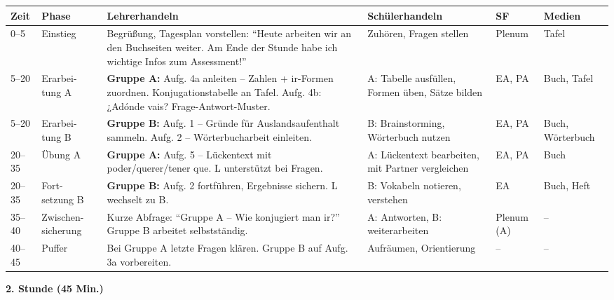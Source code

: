 \documentclass[11pt,a4paper]{article}
\begin{document}
\begin{longtable}{|p{0.8cm}|p{1.5cm}|p{4.5cm}|p{3cm}|p{1.3cm}|p{1.8cm}|}
\hline
\textbf{Zeit} & \textbf{Phase} & \textbf{Lehrerhandeln} & \textbf{Schülerhandeln} & \textbf{SF} & \textbf{Medien} \\
\hline
\endhead

0--5 & Einstieg & Begrüßung, Tagesplan vorstellen: ``Heute arbeiten wir an den Buchseiten weiter. Am Ende der Stunde habe ich wichtige Infos zum Assessment!'' & Zuhören, Fragen stellen & Plenum & Tafel \\
\hline

5--20 & Erarbei- tung A & \textbf{Gruppe A:} Aufg. 4a anleiten -- Zahlen + ir-Formen zuordnen. Konjugationstabelle an Tafel. Aufg. 4b: ¿Adónde vais? Frage-Antwort-Muster. & A: Tabelle ausfüllen, Formen üben, Sätze bilden & EA, PA & Buch, Tafel \\
\hline

5--20 & Erarbei- tung B & \textbf{Gruppe B:} Aufg. 1 -- Gründe für Auslandsaufenthalt sammeln. Aufg. 2 -- Wörterbucharbeit einleiten. & B: Brainstorming, Wörterbuch nutzen & EA, PA & Buch, Wörterbuch \\
\hline

20--35 & Übung A & \textbf{Gruppe A:} Aufg. 5 -- Lückentext mit poder/querer/tener que. L unterstützt bei Fragen. & A: Lückentext bearbeiten, mit Partner vergleichen & EA, PA & Buch \\
\hline

20--35 & Fort- setzung B & \textbf{Gruppe B:} Aufg. 2 fortführen, Ergebnisse sichern. L wechselt zu B. & B: Vokabeln notieren, verstehen & EA & Buch, Heft \\
\hline

35--40 & Zwischen- sicherung & Kurze Abfrage: ``Gruppe A -- Wie konjugiert man ir?'' Gruppe B arbeitet selbstständig. & A: Antworten, B: weiterarbeiten & Plenum (A) & -- \\
\hline

40--45 & Puffer & Bei Gruppe A letzte Fragen klären. Gruppe B auf Aufg. 3a vorbereiten. & Aufräumen, Orientierung & -- & -- \\
\hline
\end{longtable}

\vspace{1em}

\textbf{2. Stunde (45 Min.)}
\end{document}
